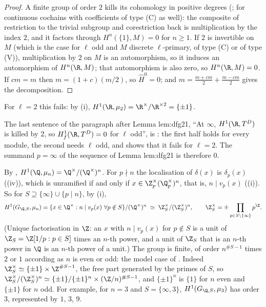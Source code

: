 \begin{proof}
A finite group of order $2$ kills its cohomology in positive degrees (; for continuous cochains with coefficients of type (C) as well): the composite
of restriction to the trivial subgroup and corestriction back is multiplication by the index $2$, and it factors through $H^n(\{1\},M)=0$ for $n\ge1$. If $2$ is
invertible on $M$ (which is the case for $\ell$ odd and $M$ discrete $\ell$-primary, of type (C) or of type (V)), multiplication by $2$ on $M$ is an automorphism, so it
induces an automorphism of $H^n(\R,M)$; that automorphism is also zero, so $H^n(\R,M)=0$. If $cm=m$ then $m=(1+c)(m/2)$, so $\hat H^0=0$; and
$m=\frac{m+cm}2+\frac{m-cm}2$ gives the decomposition.
\end{proof}

\noindent For $\ell=2$ this fails: by (i), $H^1(\R,\mu_2)=\R^\times/\R^{\times2}=\{\pm1\}$.

\begin{paperlink}\label{pl:galcoh:real}
The last sentence of the paragraph after Lemma lem:dfg21, ``At $\infty$, $H^1(\R,T^D)$ is killed by $2$, so $H^1_f(\R,T^D)=0$ for $\ell$ odd'', is
: the first half holds for every module, the second needs $\ell$ odd, and  shows that it fails for $\ell=2$. The
summand $p=\infty$ of the sequence of Lemma lem:dfg21 is therefore $0$.
\end{paperlink}

\begin{example}\label{ex:galcoh:global-kummer}
By , $H^1(\Q,\mu_n)=\Q^\times/(\Q^\times)^n$. For $p\nmid n$ the localisation of $\delta(x)$ is $\delta_p(x)$ ((iv)), which is
unramified if and only if $x\in\Z_p^\times(\Q_p^\times)^n$, that is, $n\mid v_p(x)$ ((i)). So for $S\supseteq\{\infty\}\cup\{p\mid n\}$, by
(i),
\[
H^1(G_{\Q,S},\mu_n)=\{x\in\Q^\times:n\mid v_p(x)\ \forall p\notin S\}/(\Q^\times)^n\;\simeq\;\Z_S^\times/(\Z_S^\times)^n,\qquad\Z_S^\times=\pm\prod_{p\in S\setminus\{\infty\}}p^{\Z}.
\]
(Unique factorisation in $\Z$: an $x$ with $n\mid v_p(x)$ for $p\notin S$ is a unit of $\Z_S=\Z[1/p:p\in S]$ times an $n$-th power, and a unit of $\Z_S$ that is an $n$-th power in
$\Q$ is an $n$-th power of a unit.) The group is finite, of order $n^{\#S-1}$ times $2$ or $1$ according as $n$ is even or odd: the model case of
. Indeed $\Z_S^\times\simeq\{\pm1\}\times\Z^{\#S-1}$, the free part generated by the primes of $S$, so
$\Z_S^\times/(\Z_S^\times)^n\simeq\{\pm1\}/\{\pm1\}^n\times(\Z/n)^{\#S-1}$, and $\{\pm1\}^n$ is $\{1\}$ for $n$ even and $\{\pm1\}$ for $n$ odd. For example, for $n=3$ and
$S=\{\infty,3\}$, $H^1(G_{\Q,S},\mu_3)$ has order $3$, represented by $1$, $3$, $9$.
\end{example}

